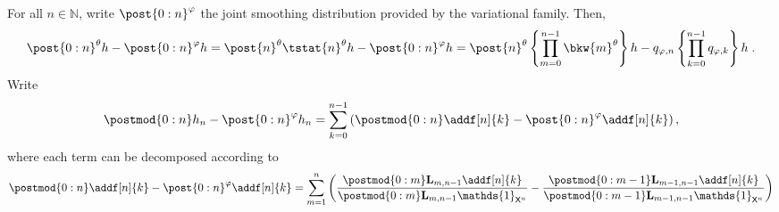 \documentclass{article}
\newcommand{\nset}{\mathbb{N}}
\newcommand{\1}{\mathbbm{1}}
\newcommand{\uk}[1]{\mathbf{L}_{#1}}
\newcommand{\Xset}{\mathsf{X}}
\newcommand{\parvec}{\theta}
\def\1{\mathds{1}}
\newcommand{\eqsp}{\;}
\begin{document}
 For all $n\in\nset$, write $\post{0:n}^{\varphi}$ the joint smoothing distribution provided by the variational family. Then,
$$
\post{0:n}^\parvec h - \post{0:n}^{\varphi} h= \post{n}^\parvec \tstat{n}^\parvec h - \post{0:n}^{\varphi} h =  \post{n}^\parvec \left\{\prod_{m = 0}^{n - 1} \bkw{m}^\parvec\right\} h - q_{\varphi,n}\left\{\prod_{k=0}^{n-1}q_{\varphi,k}\right\} h\eqsp.
$$
Write 
$$
\postmod{0:n} h_n - \post{0:n}^{\varphi} h_n = \sum_{k = 0}^{n - 1} \left( \postmod{0:n} \addf[n]{k} - \post{0:n}^{\varphi} \addf[n]{k} \right), 
$$
where each term can be decomposed according to   
\begin{equation*}
\postmod{0:n} \addf[n]{k} - \post{0:n}^\varphi \addf[n]{k} = 
\sum_{m = 1}^n \left( \frac{\postmod{0:m} \uk{m, n - 1} \addf[n]{k}}{\postmod{0:m} \uk{m, n - 1} \1_{\Xset^n}} - \frac{\postmod{0:m - 1} \uk{m - 1, n - 1} \addf[n]{k}}{\postmod{0:m - 1} \uk{m - 1, n - 1} \1_{\Xset^n}} \right)  
\end{equation*}











\clearpage
\newpage
\end{document}
